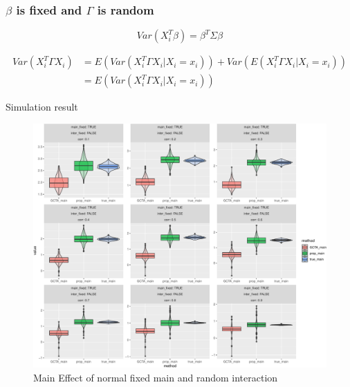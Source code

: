\documentclass[]{article}
\begin{document}
\clearpage

\subsubsection{\texorpdfstring{\(\beta\) is fixed and \(\Gamma\) is
random}{\textbackslash{}beta is fixed and \textbackslash{}Gamma is random}}\label{beta-is-fixed-and-gamma-is-random}

\[
    Var(X_i^T\beta) = \beta^T \Sigma \beta
\]

\begin{align*}
    Var(X_i^T\Gamma X_i) &= E(Var(X_i^T\Gamma X_i|X_i = x_i)) + Var(E(X_i^T\Gamma X_i|X_i = x_i)) \\ 
                         &= E(Var(X_i^T\Gamma X_i|X_i = x_i))
\end{align*}

Simulation result

\begin{figure}
\centering
\includegraphics{Simulation_report_files/figure-latex/main_fixed_random_normal-1.pdf}
\caption{Main Effect of normal fixed main and random interaction}
\end{figure}
\end{document}
